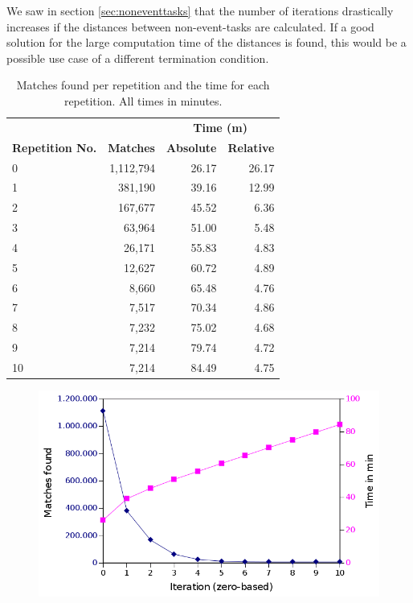 We saw in section \ref{sec:noneventtasks} that the number of iterations drastically increases if the distances between non-event-tasks are calculated.
If a good solution for the large computation time of the distances is found, this would be a possible use case of a different termination condition.

\begin{table}[h!]
		\centering
	\begin{tabular}{ l r r r }
		  \toprule
			& & \multicolumn{2}{c}{\textbf{Time (m)}} \\
			\cmidrule{3-4}
		  \textbf{Repetition No.} & \textbf{Matches} & \textbf{Absolute}& \textbf{Relative} \\
		  \midrule
     		 0  & 1,112,794 & 26.17 & 26.17\\
	       1  & 381,190   & 39.16 & 12.99\\
		    2  & 167,677   & 45.52 & 6.36\\
		    3  & 63,964    & 51.00 & 5.48\\
		    4  & 26,171    & 55.83 & 4.83\\
		    5  & 12,627    & 60.72 & 4.89\\
		    6  & 8,660     & 65.48 & 4.76\\
		    7  & 7,517     & 70.34 & 4.86\\
		    8  & 7,232     & 75.02 & 4.68\\
		    9  & 7,214     & 79.74 & 4.72\\
		    10 & 7,214     & 84.49 & 4.75\\
		  \bottomrule
		   \end{tabular}
		   \caption{Matches found per repetition and the time for each repetition. All times in minutes.}
		   \label{tab:timesandmatchesperiteration} %
	\end{table}
	\begin{figure}[h!]
		\includegraphics[width=\textwidth]{chapters/casestudy/hasehase.png}
		\caption{}
		\label{fig:hasehase}
	\end{figure}


